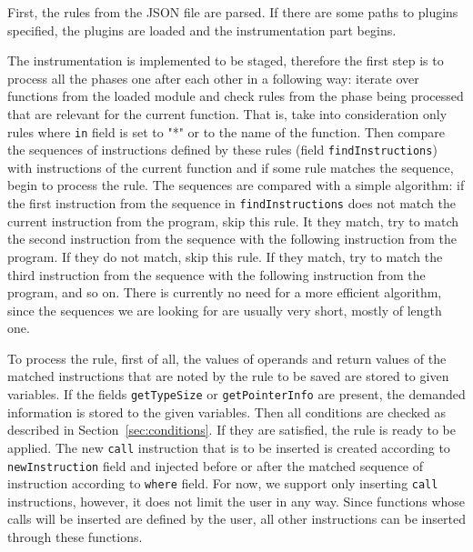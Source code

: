 First, the rules from the JSON file are parsed. If there are some paths to
plugins specified, the plugins are loaded and the instrumentation part begins.

The instrumentation is implemented to be staged, therefore the first step is to
process all the phases one after each other in a following way: iterate over
functions from the loaded module and check rules from the phase being processed
that are relevant for the current function. That is, take into consideration
only rules where \texttt{in} field is set to "*" or to the name of the
function. Then compare the sequences of instructions defined by these rules
(field \texttt{findInstructions}) with instructions of the current function and
if some rule matches the sequence, begin to process the rule. The sequences are
compared with a simple algorithm: if the first instruction from the
sequence in \texttt{findInstructions} does not match the current
instruction from the program, skip this rule. It they match, try to match
the second instruction from the sequence with the following instruction
from the program. If they do not match, skip this rule. If they match, try
to match the third instruction from the sequence with the following
instruction from the program, and so on. There is currently no need for a
more efficient algorithm, since the sequences we are looking for are
usually very short, mostly of length one.

To process the rule, first of all, the values of operands and return values of
the matched instructions that are noted by the rule to be saved are stored to
given variables. If the fields \texttt{getTypeSize} or \texttt{getPointerInfo}
are present, the demanded information is stored to the given variables. Then
all conditions are checked as described in Section~\ref{sec:conditions}. If
they are satisfied, the rule is ready to be applied. The new \texttt{call}
instruction that is to be inserted is created according to
\texttt{newInstruction} field and injected before or after the matched sequence
of instruction according to \texttt{where} field. For now, we support only
inserting \texttt{call} instructions, however, it does not limit the user in
any way. Since functions whose calls will be inserted are defined by the user,
all other instructions can be inserted through these functions.

